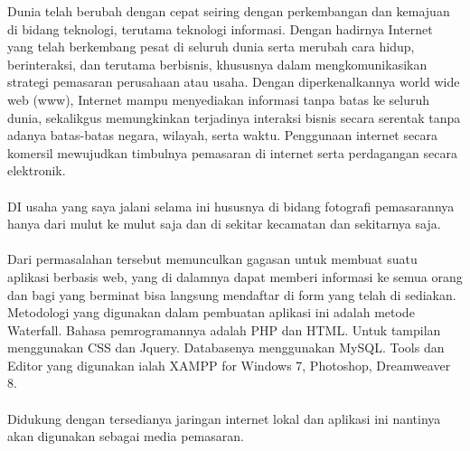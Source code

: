 \documentclass{jtetiproposalskripsi}
\begin{document}
\cover

\approvalpage


\begin{abstractind}
Dunia telah berubah dengan cepat seiring dengan perkembangan dan kemajuan di bidang teknologi, terutama teknologi informasi. Dengan hadirnya Internet yang telah berkembang pesat di seluruh dunia serta merubah cara hidup, berinteraksi, dan terutama berbisnis, khususnya dalam mengkomunikasikan strategi pemasaran perusahaan atau usaha. Dengan diperkenalkannya world wide web (www), Internet mampu menyediakan informasi tanpa batas ke seluruh dunia, sekalikgus memungkinkan terjadinya interaksi bisnis secara serentak tanpa adanya batas-batas negara, wilayah, serta waktu. Penggunaan internet secara komersil mewujudkan timbulnya pemasaran di internet serta perdagangan secara elektronik.
\paragraph{}
DI usaha yang saya jalani selama ini hususnya di bidang fotografi pemasarannya hanya dari mulut ke mulut saja dan di sekitar kecamatan dan sekitarnya saja. 
\paragraph{}
Dari permasalahan tersebut memunculkan gagasan untuk membuat suatu aplikasi berbasis web, yang di dalamnya dapat memberi informasi ke semua orang dan bagi yang berminat bisa langsung mendaftar di form yang telah di sediakan. Metodologi yang digunakan dalam pembuatan aplikasi ini adalah metode Waterfall. Bahasa pemrogramannya adalah PHP dan HTML. Untuk tampilan menggunakan CSS dan Jquery. Databasenya menggunakan MySQL. Tools dan Editor yang digunakan ialah XAMPP for Windows 7, Photoshop, Dreamweaver 8. 
\paragraph{}
Didukung dengan tersedianya jaringan internet lokal dan aplikasi ini nantinya akan digunakan sebagai media pemasaran.

\end{abstractind}
\end{document}
